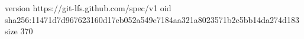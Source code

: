 version https://git-lfs.github.com/spec/v1
oid sha256:11471d7d967623160d17eb052a549e7184aa321a8023571b2c5bb14da274d183
size 370
